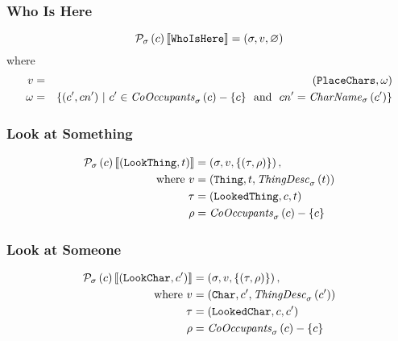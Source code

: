 \subsubsection{Who Is Here}
\[ \mathit{\mathcal{P}}_{\sigma}\left(c\right)\llbracket \texttt{WhoIsHere} \rrbracket = \left(\sigma, v, \varnothing\right) \]
where
\begin{eqnarray*}
  v &=& (\texttt{PlaceChars}, \omega) \\
  \omega &=& \{ (c', cn') ~|~ c' \in \mathit{CoOccupants}_{\sigma}\left(c\right)
  - \{ c \} ~~\text{and}~~ cn' = \mathit{CharName}_{\sigma}\left(c'\right)\}
\end{eqnarray*}

\subsubsection{Look at Something}
\begin{align*}
  \mathit{\mathcal{P}}_{\sigma}\left(c\right)\llbracket (\texttt{LookThing}, t) \rrbracket &=
  \left(\sigma, v, \{(\tau, \rho)\}\right),\\
  ~~~~~\text{where}~v &= (\texttt{Thing}, t, \mathit{ThingDesc}_{\sigma}\left(t\right)) \\
  \tau & = (\texttt{LookedThing}, c, t) \\
  \rho & = \mathit{CoOccupants}_{\sigma}\left(c\right) - \{ c \}
\end{align*}

\subsubsection{Look at Someone}
\begin{align*}
  \mathit{\mathcal{P}}_{\sigma}\left(c\right)\llbracket (\texttt{LookChar}, c') \rrbracket &=
  \left(\sigma, v, \{(\tau, \rho)\}\right),\\
  ~~~~~\text{where}~v &= (\texttt{Char}, c', \mathit{ThingDesc}_{\sigma}\left(c'\right)) \\
  \tau & = (\texttt{LookedChar}, c, c') \\
  \rho & = \mathit{CoOccupants}_{\sigma}\left(c\right) - \{ c \}
\end{align*}

